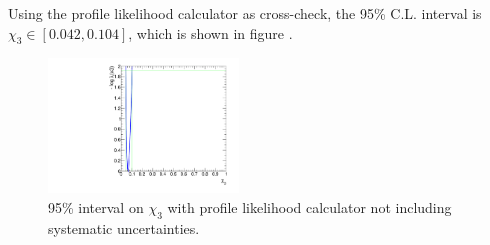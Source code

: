 Using the profile likelihood calculator as cross-check, the 95\% C.L. interval is
$\chi_{3} \in   [0.042, 0.104]$, 
which is shown in figure .  
  

\begin{figure}[hbtp]
  \begin{center}
    \includegraphics[angle=0,width=0.45\textwidth]{figures/limits/PLRx3_0100.pdf}
    \caption{95\% interval on $\chi_{3}$ with profile likelihood calculator not including systematic uncertainties. }
    \label{fig:PLRx3_0100}
  \end{center}
\end{figure}
